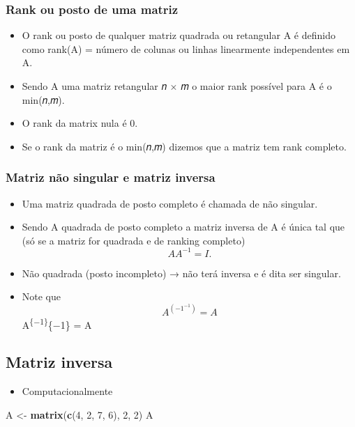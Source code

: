 \documentclass[
]{article}
\newenvironment{Shaded}{\begin{snugshade}}{\end{snugshade}}
\newcommand{\DecValTok}[1]{\textcolor[rgb]{0.00,0.00,0.81}{#1}}
\newcommand{\FunctionTok}[1]{\textcolor[rgb]{0.13,0.29,0.53}{\textbf{#1}}}
\newcommand{\NormalTok}[1]{#1}
\newcommand{\OtherTok}[1]{\textcolor[rgb]{0.56,0.35,0.01}{#1}}
\providecommand{\tightlist}{%
  \setlength{\itemsep}{0pt}\setlength{\parskip}{0pt}}
\begin{document}
\hypertarget{rank-ou-posto-de-uma-matriz}{%
\subsubsection{Rank ou posto de uma
matriz}\label{rank-ou-posto-de-uma-matriz}}

\begin{itemize}
\tightlist
\item
  O rank ou posto de qualquer matriz quadrada ou retangular A é definido
  como rank(A) = número de colunas ou linhas linearmente independentes
  em A.
\item
  Sendo A uma matriz retangular 𝑛 × 𝑚 o maior rank possível para A é o
  min(𝑛,𝑚).
\item
  O rank da matrix nula é 0.
\item
  Se o rank da matriz é o min(𝑛,𝑚) dizemos que a matriz tem rank
  completo.
\end{itemize}

\hypertarget{matriz-nuxe3o-singular-e-matriz-inversa}{%
\subsubsection{Matriz não singular e matriz
inversa}\label{matriz-nuxe3o-singular-e-matriz-inversa}}

\begin{itemize}
\tightlist
\item
  Uma matriz quadrada de posto completo é chamada de não singular.
\item
  Sendo A quadrada de posto completo a matriz inversa de A é única tal
  que (só se a matriz for quadrada e de ranking completo) \[
  AA^{−1} = I.
  \]
\item
  Não quadrada (posto incompleto) → não terá inversa e é dita ser
  singular.
\item
  Note que \[
  A^{(-1^{-1})} =A
  \] A\textsuperscript{\{−1\}}\{−1\} = A
\end{itemize}

\hypertarget{matriz-inversa}{%
\subsection{Matriz inversa}\label{matriz-inversa}}

\begin{itemize}
\tightlist
\item
  Computacionalmente
\end{itemize}

\begin{Shaded}
\begin{Highlighting}[]
\NormalTok{A }\OtherTok{\textless{}{-}} \FunctionTok{matrix}\NormalTok{(}\FunctionTok{c}\NormalTok{(}\DecValTok{4}\NormalTok{, }\DecValTok{2}\NormalTok{, }\DecValTok{7}\NormalTok{, }\DecValTok{6}\NormalTok{), }\DecValTok{2}\NormalTok{, }\DecValTok{2}\NormalTok{)}
\NormalTok{A}
\end{Highlighting}
\end{Shaded}
\end{document}
